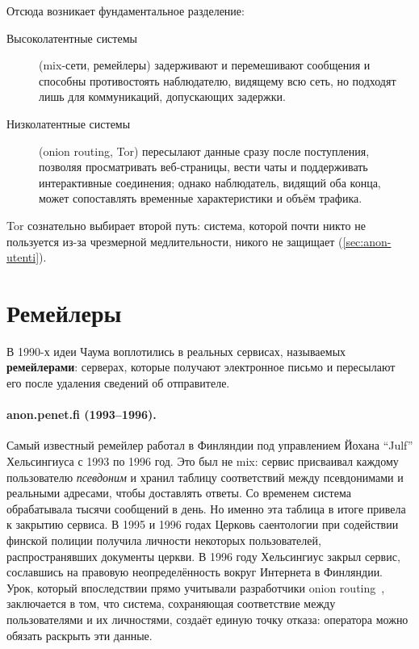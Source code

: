 Отсюда возникает фундаментальное разделение:
\begin{description}
  \item[Высоколатентные системы] (mix-сети, ремейлеры) задерживают и перемешивают сообщения и способны противостоять наблюдателю, видящему всю сеть, но подходят лишь для коммуникаций, допускающих задержки.
  \item[Низколатентные системы] (onion routing, Tor) пересылают данные сразу после поступления, позволяя просматривать веб-страницы, вести чаты и поддерживать интерактивные соединения; однако наблюдатель, видящий оба конца, может сопоставлять временные характеристики и объём трафика.
\end{description}
Tor сознательно выбирает второй путь: система, которой почти никто не пользуется из-за чрезмерной медлительности, никого не защищает (\cref{sec:anon-utenti}).

\section{Ремейлеры}\label{sec:radici-remailer}

В 1990-х идеи Чаума воплотились в реальных сервисах, называемых \textbf{ремейлерами}: серверах, которые получают электронное письмо и пересылают его после удаления сведений об отправителе.

\paragraph{anon.penet.fi (1993--1996).} Самый известный ремейлер работал в Финляндии под управлением Йохана \enquote{Julf} Хельсингиуса с 1993 по 1996 год. Это был не mix: сервис присваивал каждому пользователю \emph{псевдоним} и хранил таблицу соответствий между псевдонимами и реальными адресами, чтобы доставлять ответы. Со временем система обрабатывала тысячи сообщений в день. Но именно эта таблица в итоге привела к закрытию сервиса. В 1995 и 1996 годах Церковь саентологии при содействии финской полиции получила личности некоторых пользователей, распространявших документы церкви. В 1996 году Хельсингиус закрыл сервис, сославшись на правовую неопределённость вокруг Интернета в Финляндии. Урок, который впоследствии прямо учитывали разработчики onion routing~\cite{syverson2011peel}, заключается в том, что система, сохраняющая соответствие между пользователями и их личностями, создаёт единую точку отказа: оператора можно обязать раскрыть эти данные.

